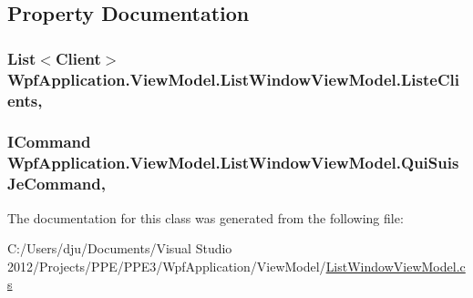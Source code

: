 \subsection{Property Documentation}
\hypertarget{class_wpf_application_1_1_view_model_1_1_list_window_view_model_a971a86a9000bf6c012967e817f59a2c4}{
\subsubsection[{Liste\-Clients}]{\setlength{\rightskip}{0pt plus 5cm}List$<${\bf Client}$>$ Wpf\-Application.\-View\-Model.\-List\-Window\-View\-Model.\-Liste\-Clients\hspace{0.3cm}{\ttfamily [get]}, {\ttfamily [set]}}}\label{class_wpf_application_1_1_view_model_1_1_list_window_view_model_a971a86a9000bf6c012967e817f59a2c4}
\hypertarget{class_wpf_application_1_1_view_model_1_1_list_window_view_model_a08034eb12e314399e69dbf09850fc1fc}{
\subsubsection[{Qui\-Suis\-Je\-Command}]{\setlength{\rightskip}{0pt plus 5cm}I\-Command Wpf\-Application.\-View\-Model.\-List\-Window\-View\-Model.\-Qui\-Suis\-Je\-Command\hspace{0.3cm}{\ttfamily [get]}, {\ttfamily [set]}}}\label{class_wpf_application_1_1_view_model_1_1_list_window_view_model_a08034eb12e314399e69dbf09850fc1fc}


The documentation for this class was generated from the following file\-:\begin{DoxyCompactItemize}
\item 
C\-:/\-Users/dju/\-Documents/\-Visual Studio 2012/\-Projects/\-P\-P\-E/\-P\-P\-E3/\-Wpf\-Application/\-View\-Model/\hyperlink{_list_window_view_model_8cs}{List\-Window\-View\-Model.\-cs}\end{DoxyCompactItemize}
